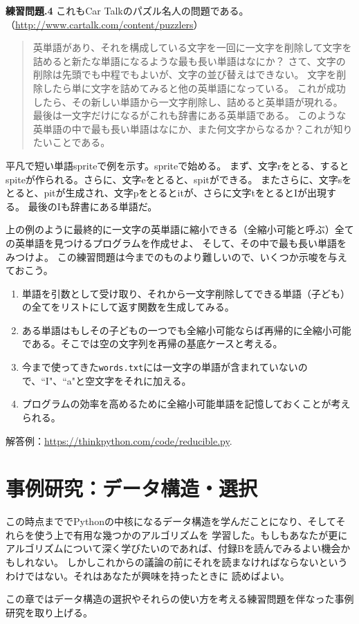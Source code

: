 \documentclass[a4j,12pt,makeidx]{jbook}
\newcommand{\tp}{\thechapter}
\begin{document}
\noindent
{\bf 練習問題\tp.4} これもCar Talkのパズル名人の問題である。
（\url{http://www.cartalk.com/content/puzzlers}） \\
\begin{quote}
英単語があり、それを構成している文字を一回に一文字を削除して文字を詰めると新たな単語になるような最も長い単語はなにか？
さて、文字の削除は先頭でも中程でもよいが、文字の並び替えはできない。
文字を削除したら単に文字を詰めてみると他の英単語になっている。
これが成功したら、その新しい単語から一文字削除し、詰めると英単語が現れる。
最後は一文字だけになるがこれも辞書にある英単語である。
このような英単語の中で最も長い単語はなにか、また何文字からなるか？これが知りたいことである。
\end{quote}
平凡で短い単語spriteで例を示す。spriteで始める。
まず、文字rをとる、するとspiteが作られる。さらに、文字eをとると、spitができる。
またさらに、文字sをとると、pitが生成され、文字pをとるとitが、さらに文字tをとるとIが出現する。
最後のIも辞書にある単語だ。\par
上の例のように最終的に一文字の英単語に縮小できる（全縮小可能と呼ぶ）全ての英単語を見つけるプログラムを作成せよ、
そして、その中で最も長い単語をみつけよ。
この練習問題は今までのものより難しいので、いくつか示唆を与えておこう。
\begin{enumerate}
\item 単語を引数として受け取り、それから一文字削除してできる単語（子ども）の全てをリストにして返す関数を生成してみる。
\item ある単語はもしその子どもの一つでも全縮小可能ならば再帰的に全縮小可能である。そこでは空の文字列を再帰の基底ケースと考える。
\item 今まで使ってきた{\tt words.txt}には一文字の単語が含まれていないので、``I"、``a"と空文字をそれに加える。
\item プログラムの効率を高めるために全縮小可能単語を記憶しておくことが考えられる。
\end{enumerate} 
\noindent
解答例：\url{https://thinkpython.com/code/reducible.py}.
%
\chapter{事例研究：データ構造・選択}
この時点まででPythonの中核になるデータ構造を学んだことになり、そしてそれらを使う上で有用な幾つかのアルゴリズムを
学習した。もしもあなたが更にアルゴリズムについて深く学びたいのであれば、付録Bを読んでみるよい機会かもしれない。
しかしこれからの議論の前にそれを読まなければならないというわけではない。それはあなたが興味を持ったときに
読めばよい。\par
この章ではデータ構造の選択やそれらの使い方を考える練習問題を伴なった事例研究を取り上げる。
%
\end{document}
